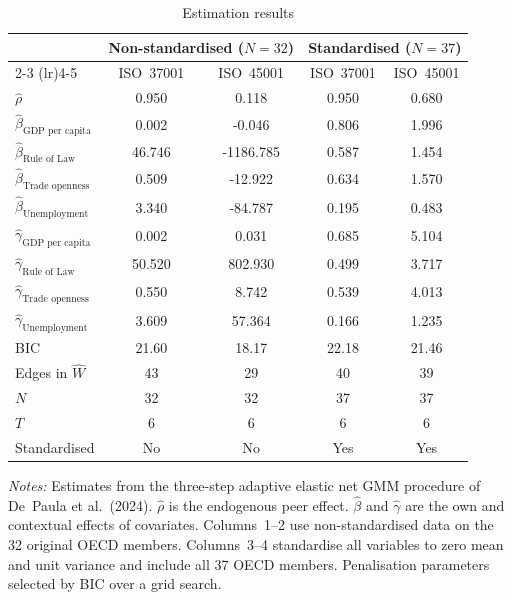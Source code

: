 \begin{table}[htbp]
\centering
\caption{Estimation results}
\label{tab:estimation}
\begin{tabular}{lcccc}
\hline\hline
 & \multicolumn{2}{c}{Non-standardised ($N=32$)} & \multicolumn{2}{c}{Standardised ($N=37$)} \\
\cmidrule(lr){2-3} \cmidrule(lr){4-5}
 & ISO~37001 & ISO~45001 & ISO~37001 & ISO~45001 \\
\hline
$\hat{\rho}$ & 0.950 & 0.118 & 0.950 & 0.680 \\
$\hat{\beta}_{\text{GDP per capita}}$ & 0.002 & -0.046 & 0.806 & 1.996 \\
$\hat{\beta}_{\text{Rule of Law}}$ & 46.746 & -1186.785 & 0.587 & 1.454 \\
$\hat{\beta}_{\text{Trade openness}}$ & 0.509 & -12.922 & 0.634 & 1.570 \\
$\hat{\beta}_{\text{Unemployment}}$ & 3.340 & -84.787 & 0.195 & 0.483 \\
$\hat{\gamma}_{\text{GDP per capita}}$ & 0.002 & 0.031 & 0.685 & 5.104 \\
$\hat{\gamma}_{\text{Rule of Law}}$ & 50.520 & 802.930 & 0.499 & 3.717 \\
$\hat{\gamma}_{\text{Trade openness}}$ & 0.550 & 8.742 & 0.539 & 4.013 \\
$\hat{\gamma}_{\text{Unemployment}}$ & 3.609 & 57.364 & 0.166 & 1.235 \\
\hline
BIC & 21.60 & 18.17 & 22.18 & 21.46 \\
Edges in $\hat{W}$ & 43 & 29 & 40 & 39 \\
$N$ & 32 & 32 & 37 & 37 \\
$T$ & 6 & 6 & 6 & 6 \\
Standardised & No & No & Yes & Yes \\
\hline\hline
\end{tabular}
\begin{minipage}{0.95\textwidth}
\vspace{4pt}
\footnotesize \textit{Notes:} Estimates from the three-step adaptive elastic net GMM procedure of De~Paula et al.\ (2024). $\hat{\rho}$ is the endogenous peer effect. $\hat{\beta}$ and $\hat{\gamma}$ are the own and contextual effects of covariates. Columns~1--2 use non-standardised data on the 32 original OECD members. Columns~3--4 standardise all variables to zero mean and unit variance and include all 37 OECD members. Penalisation parameters selected by BIC over a grid search.
\end{minipage}
\end{table}
